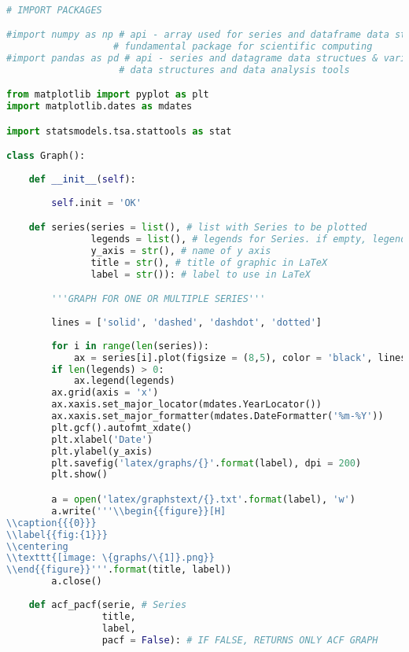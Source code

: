 \begin{lstlisting}[language=Python]

# IMPORT PACKAGES

#import numpy as np # api - array used for series and dataframe data structures
                   # fundamental package for scientific computing
#import pandas as pd # api - series and datagrame data structues & various 
                    # data structures and data analysis tools

from matplotlib import pyplot as plt
import matplotlib.dates as mdates

import statsmodels.tsa.stattools as stat

class Graph():
    
    def __init__(self):
        
        self.init = 'OK'

    def series(series = list(), # list with Series to be plotted
               legends = list(), # legends for Series. if empty, legends are not included
               y_axis = str(), # name of y axis
               title = str(), # title of graphic in LaTeX
               label = str()): # label to use in LaTeX

        '''GRAPH FOR ONE OR MULTIPLE SERIES'''
        
        lines = ['solid', 'dashed', 'dashdot', 'dotted']
        
        for i in range(len(series)):
            ax = series[i].plot(figsize = (8,5), color = 'black', linestyle = lines[i])
        if len(legends) > 0:
            ax.legend(legends)
        ax.grid(axis = 'x')
        ax.xaxis.set_major_locator(mdates.YearLocator())
        ax.xaxis.set_major_formatter(mdates.DateFormatter('%m-%Y'))
        plt.gcf().autofmt_xdate()
        plt.xlabel('Date')
        plt.ylabel(y_axis)
        plt.savefig('latex/graphs/{}'.format(label), dpi = 200)
        plt.show()

        a = open('latex/graphstext/{}.txt'.format(label), 'w')
        a.write('''\\begin{{figure}}[H]
\\caption{{{0}}}
\\label{{fig:{1}}}
\\centering
\\texttt{[image: \{graphs/\{1]}.png}}
\\end{{figure}}'''.format(title, label))
        a.close()
    
    def acf_pacf(serie, # Series
                 title,
                 label, 
                 pacf = False): # IF FALSE, RETURNS ONLY ACF GRAPH


\end{lstlisting}

